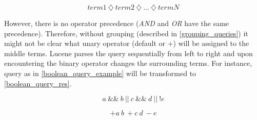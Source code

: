 \begin{equation}
\label{multiple_boolean_op}
term1\ \diamondsuit \ term2\ \diamondsuit \ … \ \diamondsuit \ termN
\end{equation}

However, there is no operator precedence (\textit{AND} and \textit{OR} have the same precedence). Therefore, without grouping
(described in \ref{grouping_queries}) it might
not be clear what unary operator (default or +) will be assigned to the middle terms.
Lucene parses the query sequentially from left to right and upon encountering the binary operator changes the surrounding terms. For instance,
query as in \ref{boolean_query_example} will be transformed to \ref{boolean_query_res}.

\begin{equation}
\label{boolean_query_example}
a\ \&\&\ b\ \vert\vert\ c\ \&\&\ d\ \vert\vert\ !e
\end{equation}

\begin{equation}
\label{boolean_query_res}
{+}a\ b\ {+}c\ d\ {-}e
\end{equation}

